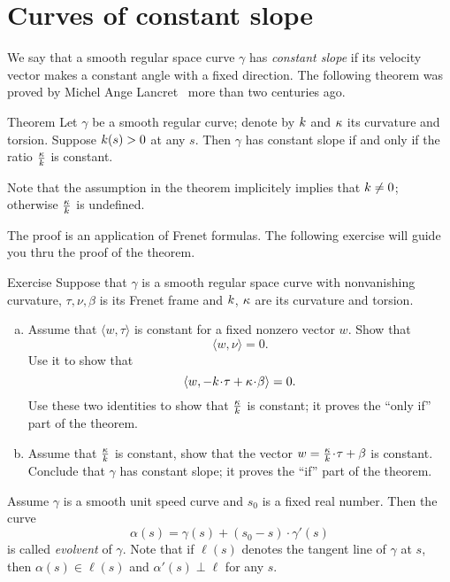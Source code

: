 \section*{Curves of constant slope}

We say that a smooth regular space curve $\gamma$ has \emph{constant slope} if its velocity vector makes a constant angle with a fixed direction.
The following theorem was proved by Michel Ange Lancret~\cite{lancret} more than two centuries ago.

\begin{thm}{Theorem}\label{thm:const-slope}
Let $\gamma$ be a smooth regular curve;
denote by $k$ and $\kappa$ its curvature and torsion.
Suppose $k(s)>0$ at any $s$.
Then $\gamma$ has constant slope if and only if the ratio $\tfrac{\kappa}{k}$ is constant.
\end{thm}

Note that the assumption in the theorem implicitely implies that $k\ne 0$;
otherwise $\tfrac{\kappa}{k}$ is undefined.

The proof is an application of Frenet formulas.
The following exercise will guide you thru the proof of the theorem. 

\begin{thm}{Exercise} \label{ex:lancret}
Suppose that $\gamma$ is a smooth regular space curve with nonvanishing curvature, $\tau,\nu,\beta$ 
is its Frenet frame and $k$, $\kappa$ are its curvature and torsion.
\begin{enumerate}[(a)]
\item\label{ex:lancret:a} 
Assume that  $\langle w,\tau\rangle$ is constant for a fixed nonzero vector $w$.
Show that 
\[\langle w, \nu\rangle =0.\]
Use it to show that 
\[\langle w, -\kur\cdot\tau+\tor\cdot \beta\rangle =0.\]
Use these two identities to show that $\tfrac{\kappa}{k}$ is constant;
it proves the ``only if'' part of the theorem.

\item Assume that $\tfrac{\kappa}{k}$ is constant, show that the vector $w=\tfrac\tor\kur\cdot \tau+\beta$ is constant.
Conclude that $\gamma$ has constant slope; it proves the ``if'' part of the theorem.
\end{enumerate}
\end{thm}

Assume $\gamma$ is a smooth unit speed curve and $s_0$ is a fixed real number. %
Then the curve 
\[\alpha(s)=\gamma(s)+(s_0-s)\cdot \gamma'(s)\]
is called \emph{evolvent} of $\gamma$.
Note that if $\ell(s)$ denotes the tangent line of $\gamma$ at $s$,
then $\alpha(s)\in \ell(s)$ and $\alpha'(s)\perp \ell$ for any $s$.

